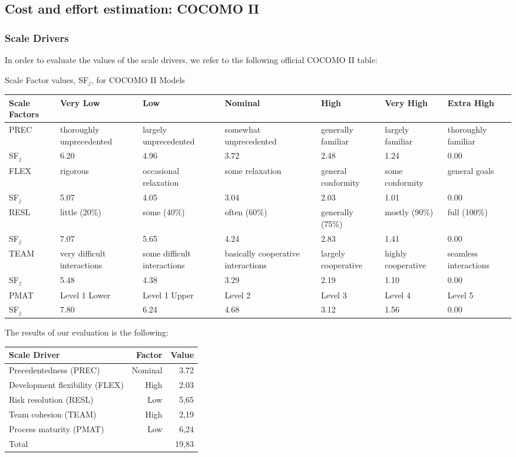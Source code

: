 \documentclass[english]{article}
\newcommand{\fptotal}[1]{
	\multicolumn{2}{|l|}{{Total}}
	& #1\\\hline
}
\newenvironment{scaledriverstable}[1]{
	\setlength{\LTleft}{-40pt}
	\begin{center}
	#1 
	\begin{longtable}{|p{\dimexpr.16\textwidth}|p{\dimexpr.14\textwidth}|p{\dimexpr.14\textwidth}|p{\dimexpr.14\textwidth}|p{\dimexpr.14\textwidth}|p{\dimexpr.14\textwidth}|p{\dimexpr.14\textwidth}|}
	\hline
}{
	\hline\end{longtable}\end{center}
}
\newenvironment{factorcounttable}[1]{
	\begin{center}
	\begin{longtable}{|l|r|r|}
	\hline 
	#1 & Factor & Value \\\hline
}{
	\end{longtable}\end{center}
}
\newcommand{\addfactor}[7]{
	#1 & #2 & #3 & #4 & #5 & #6 & #7 \\
}
\newcommand{\addfactorvalues}[6]{
SF$_j$ & #1 & #2 & #3 & #4 & #5 & #6 \\\hline
}
\begin{document}
\subsection{Cost and effort estimation: COCOMO II}
\subsubsection{Scale Drivers}
In order to evaluate the values of the scale drivers, we refer to the following official COCOMO II table:

\pagebreak
\begin{scaledriverstable}{Scale Factor values, SF$_j$, for COCOMO II Models}
	Scale Factors & Very Low & Low & Nominal & High & Very High & Extra High\\\hline
	\addfactor{PREC}{thoroughly unprecedented}{largely unprecedented}{somewhat unprecedented}{generally familiar}{largely familiar}{thoroughly familiar}
	\addfactorvalues{6.20}{4.96}{3.72}{2.48}{1.24}{0.00}
	\addfactor{FLEX}{rigorous}{occasional relaxation}{some relaxation}{general conformity}{some conformity}{general goals}
	\addfactorvalues{5.07}{4.05}{3.04}{2.03}{1.01}{0.00}
	\addfactor{RESL}{little (20\%)}{some (40\%)}{often (60\%)}{generally (75\%)}{mostly (90\%)}{full (100\%)}
	\addfactorvalues{7.07}{5.65}{4.24}{2.83}{1.41}{0.00}
	\addfactor{TEAM}{very difficult interactions}{some difficult interactions}{basically cooperative interactions}{largely cooperative}{highly cooperative}{seamless interactions}
	\addfactorvalues{5.48}{4.38}{3.29}{2.19}{1.10}{0.00}
	\addfactor{PMAT}{Level 1 Lower}{Level 1 Upper}{Level 2}{Level 3}{Level 4}{Level 5}
	\addfactorvalues{7.80}{6.24}{4.68}{3.12}{1.56}{0.00}
\end{scaledriverstable}
The results of our evaluation is the following:
\begin{factorcounttable}{Scale Driver}
	Precedentedness (PREC) & Nominal & 3.72\\
	Development flexibility (FLEX) & High & 2.03\\
	Risk resolution (RESL) & Low & 5,65\\
	Team cohesion (TEAM) & High & 2,19\\
	Process maturity (PMAT) & Low & 6,24\\\hline
	\fptotal{19,83}
\end{factorcounttable}
\end{document}
